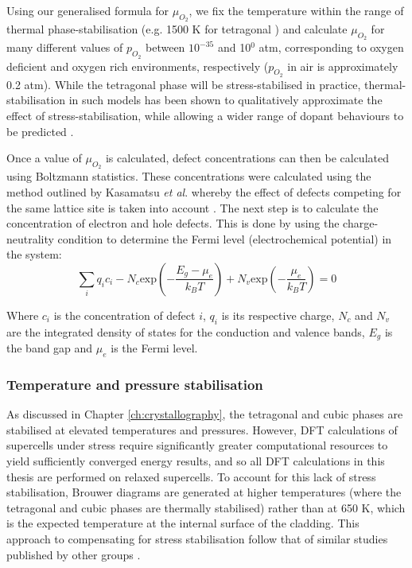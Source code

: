 Using our generalised formula for $\mu_{O_2}$, we fix the temperature within the range of thermal phase-stabilisation (e.g. 1500 K for tetragonal \zirconia) and calculate $\mu_{O_2}$ for many different values of $p_{O_2}$ between $10^{-35}$ and 10$^{0}$ atm, corresponding to oxygen deficient and oxygen rich environments, respectively ($p_{O_2}$ in air is approximately 0.2 atm). While the tetragonal phase will be stress-stabilised in practice, thermal-stabilisation in such models has been shown to qualitatively approximate the effect of stress-stabilisation, while allowing a wider range of dopant behaviours to be predicted \cite{Bell2016}. 

Once a value of $\mu_{O_2}$ is calculated, defect concentrations can then be calculated using Boltzmann statistics. These concentrations were calculated using the method outlined by Kasamatsu \emph{et al}. whereby the effect of defects competing for the same lattice site is taken into account \cite{Kasamatsu2012}. The next step is to calculate the concentration of electron and hole defects. This is done by using the charge-neutrality condition to determine the Fermi level (electrochemical potential) in the system:
\begin{equation}
\sum_{i}q_{i}c_{i} - N_{c}\textrm{exp}{(-\frac{E_{g}-\mu_{e}}{k_{B}T})} + N_{v}\textrm{exp}{(-\frac{\mu_{e}}{k_{B}T})} = 0
\label{charge_neutrality}
\end{equation}

Where $c_{i}$ is the concentration of defect $i$, $q_{i}$ is its respective charge, $N_{c}$ and $N_{v}$ are the integrated density of states for the conduction and valence bands, $E_{g}$ is the band gap and $\mu_{e}$ is the Fermi level. 

\subsubsection{Temperature and pressure stabilisation}

As discussed in Chapter \ref{ch:crystallography}, the tetragonal and cubic phases are stabilised at elevated temperatures and pressures. However, DFT calculations of supercells under stress require significantly greater computational resources to yield sufficiently converged energy results, and so all DFT calculations in this thesis are performed on relaxed supercells. To account for this lack of stress stabilisation, Brouwer diagrams are generated at higher temperatures (where the tetragonal and cubic phases are thermally stabilised) rather than at 650 K, which is the expected temperature at the internal surface of the cladding. This approach to compensating for stress stabilisation follow that of similar studies published by other groups \cite{youssef2012intrinsic, Youssef2014, Otgonbaatar2014}.

